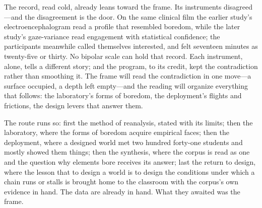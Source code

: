 The record, read cold, already leans toward the frame. Its instruments disagreed---and the disagreement is the door. On the same clinical film the earlier study's electroencephalogram read a profile that resembled boredom, while the later study's gaze-variance read engagement with statistical confidence; the participants meanwhile called themselves interested, and felt seventeen minutes as twenty-five or thirty. No bipolar scale can hold that record. Each instrument, alone, tells a different story; and the program, to its credit, kept the contradiction rather than smoothing it. The frame will read the contradiction in one move---a surface occupied, a depth left empty---and the reading will organize everything that follows: the laboratory's forms of boredom, the deployment's flights and frictions, the design levers that answer them.

The route runs so: first the method of reanalysis, stated with its limits; then the laboratory, where the forms of boredom acquire empirical faces; then the deployment, where a designed world met two hundred forty-one students and mostly showed them things; then the synthesis, where the corpus is read as one and the question why elements bore receives its answer; last the return to design, where the lesson that to design a world is to design the conditions under which a chain runs or stalls is brought home to the classroom with the corpus's own evidence in hand. The data are already in hand. What they awaited was the frame.

